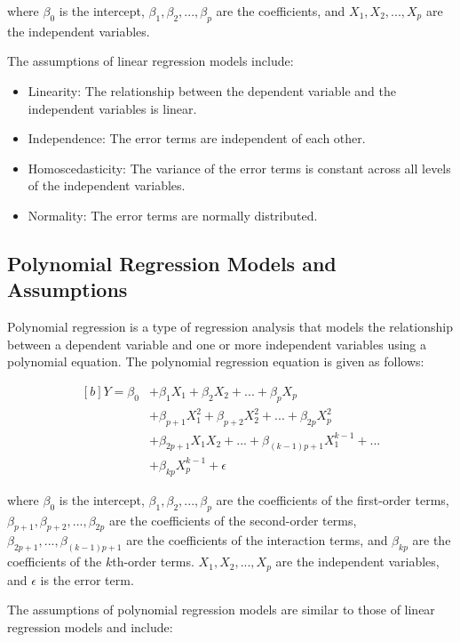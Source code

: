 \documentclass{beamer}
\begin{document}
where $\beta_0$ is the intercept, $\beta_1, \beta_2, ..., \beta_p$ are the coefficients, and $X_1, X_2, ..., X_p$ are the independent variables.

The assumptions of linear regression models include:

\begin{itemize}
\item Linearity: The relationship between the dependent variable and the independent variables is linear.
\item Independence: The error terms are independent of each other.
\item Homoscedasticity: The variance of the error terms is constant across all levels of the independent variables.
\item Normality: The error terms are normally distributed.
\end{itemize}

\subsection{Polynomial Regression Models and Assumptions}
Polynomial regression is a type of regression analysis that models the relationship between a dependent variable and one or more independent variables using a polynomial equation. The polynomial regression equation is given as follows:

\begin{equation}
    \begin{aligned}[b]
    Y = \beta_0 &+ \beta_1X_1 + \beta_2X_2 + ... + \beta_pX_p \\
    &+ \beta_{p+1}X_1^2 + \beta_{p+2}X_2^2 + ... + \beta_{2p}X_p^2 \\
    &+ \beta_{2p+1}X_1X_2 + ... + \beta_{(k-1)p+1}X_1^{k-1} + ... \\
    &+ \beta_{kp}X_p^{k-1} + \epsilon
    \end{aligned}
    \end{equation}
    

where $\beta_0$ is the intercept, $\beta_1, \beta_2, ..., \beta_p$ are the coefficients of the first-order terms, $\beta_{p+1}, \beta_{p+2}, ..., \beta_{2p}$ are the coefficients of the second-order terms, $\beta_{2p+1}, ..., \beta_{(k-1)p+1}$ are the coefficients of the interaction terms, and $\beta_{kp}$ are the coefficients of the $k$th-order terms. $X_1, X_2, ..., X_p$ are the independent variables, and $\epsilon$ is the error term.

The assumptions of polynomial regression models are similar to those of linear regression models and include:
\end{document}
